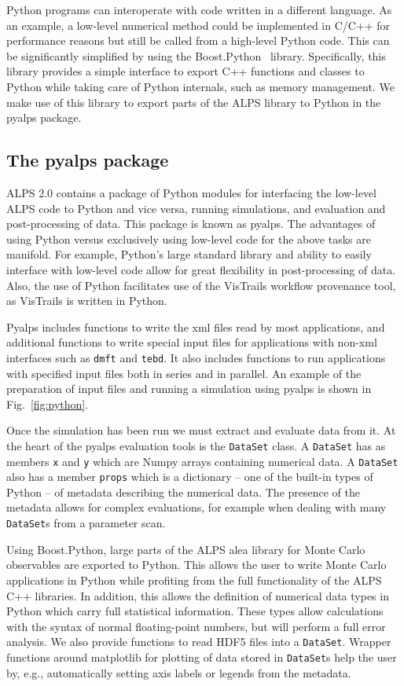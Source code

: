 \documentclass[12pt]{iopart}
\begin{document}
Python programs can interoperate with code written in a different language. As an example, a low-level numerical method could be implemented in C/C++ for performance reasons but still be called from a high-level Python code. This can be significantly simplified by using the Boost.Python~\cite{boost} library. Specifically, this library provides a simple interface to export C++ functions and classes to Python while taking care of Python internals, such as memory management. We make use of this library to export parts of the ALPS library to Python in the pyalps package.

\subsection{The pyalps package}
ALPS 2.0 contains a package of Python modules for interfacing the low-level ALPS code to Python and vice versa, running simulations, and evaluation and post-processing of data. This package is known as pyalps. The advantages of using Python versus exclusively using low-level code for the above tasks are manifold. For example, Python's large standard library and ability to easily interface with low-level code allow for great flexibility in post-processing of data. Also, the use of Python facilitates use of the VisTrails workflow provenance tool, as VisTrails is written in Python.

Pyalps includes functions to write the xml files read by most applications, and additional functions to write special input files for applications with non-xml interfaces such as {\tt dmft} and {\tt tebd}. It also includes functions to run applications with specified input files both in series and in parallel. An example of the preparation of input files and running a simulation using pyalps is shown in Fig.~\ref{fig:python}.

Once the simulation has been run we must extract and evaluate data from it. At the heart of the pyalps evaluation tools is the {\tt DataSet} class. A {\tt DataSet} has as members {\tt x} and {\tt y} which are Numpy arrays containing numerical data. A {\tt DataSet} also has a member {\tt props} which is a dictionary -- one of the built-in types of Python -- of metadata describing the numerical data. The presence of the metadata allows for complex evaluations, for example when dealing with many {\tt DataSet}s from a parameter scan.

Using Boost.Python, large parts of the ALPS alea library for Monte Carlo observables are exported to Python. This allows the user to write Monte Carlo applications in Python while profiting from the full functionality of the ALPS C++ libraries. In addition, this allows the definition of numerical data types in Python which carry full statistical information. These types allow calculations with the syntax of normal floating-point numbers, but will perform a full error analysis. We also provide functions to read HDF5 files into a {\tt DataSet}. Wrapper functions around matplotlib for plotting of data stored in {\tt DataSet}s help the user by, e.g., automatically setting axis labels or legends from the metadata.
\end{document}
